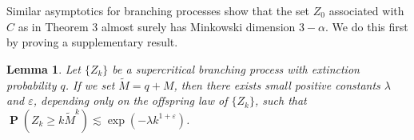 \documentclass[dvipsnames,letterpaper,12pt]{article}
\numberwithin{equation}{section}
\theoremstyle{plain}
\newtheorem{lemma}{Lemma}
\DeclareMathOperator{\Prob}{\mathbf{P}}
\begin{document}
Similar asymptotics for branching processes show that the set $Z_0$ associated with $C$ as in Theorem 3 almost surely has Minkowski dimension $3 - \alpha$. We do this first by proving a supplementary result.


\begin{lemma}\label{branchingtrick}
	Let $\{ Z_k \}$ be a supercritical branching process with extinction probability $q$. If we set $\tilde{M} = q + M$, then there exists small positive constants $\lambda$ and $\varepsilon$, depending only on the offspring law of $\{ Z_k \}$, such that $\Prob(Z_k \geq k \tilde{M}^k) \lesssim \exp \left(-\lambda k^{1 + \varepsilon} \right)$.
\end{lemma}
\end{document}
